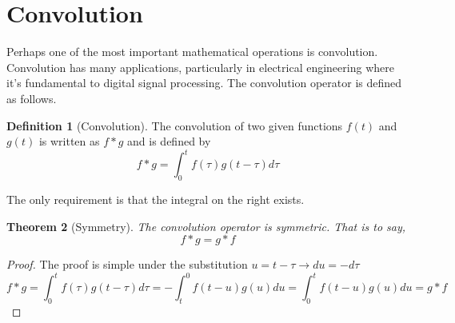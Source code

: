 \documentclass{report}
\newtheorem{theorem}{Theorem}[chapter]
\theoremstyle{definition}
\newtheorem{definition}[theorem]{Definition}
\theoremstyle{remark}
\begin{document}
\section{Convolution}
Perhaps one of the most important mathematical operations is convolution. Convolution has many applications, particularly in electrical engineering where it's fundamental to digital signal processing. The convolution operator is defined as follows.
\begin{definition} [Convolution]
    The convolution of two given functions $f(t)$ and $g(t)$ is written as $f*g$ and is defined by 
    \begin{equation*}
        f*g = \int^t_0f(\tau) g(t-\tau)d\tau
    \end{equation*}
\end{definition}
The only requirement is that the integral on the right exists.
\begin{theorem}[Symmetry]
The convolution operator is symmetric. That is to say, 
    \begin{equation*}
        f*g=g*f
    \end{equation*}
\end{theorem}
\begin{proof}
    The proof is simple under the substitution $u=t-\tau\rightarrow du = -d\tau$ 
    \begin{equation*}
        f*g=\int^t_0f(\tau)g(t-\tau)d\tau = -\int^0_tf(t-u)g(u)du = \int^t_0f(t-u)g(u)du = g*f
    \end{equation*}
\end{proof}
\end{document}
